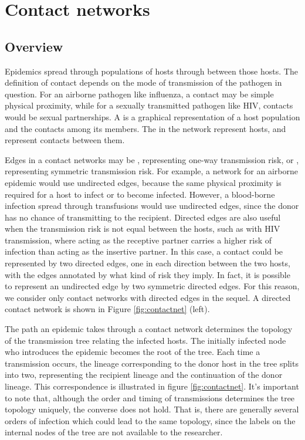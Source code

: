 \section{Contact networks}
\label{subsec:contactnet}

\subsection{Overview}

Epidemics spread through populations of hosts through  between
those hosts. The definition of contact depends on the mode of transmission of
the pathogen in question. For an airborne pathogen like influenza, a contact
may be simple physical proximity, while for a sexually transmitted pathogen
like HIV, contacts would be sexual partnerships. A  is a
graphical representation of a host population and the contacts among its
members. The  in the network represent hosts, and 
represent contacts between them. 

Edges in a contact networks may be , representing one-way
transmission risk, or , representing symmetric transmission
risk. For example, a network for an airborne epidemic would use undirected
edges, because the same physical proximity is required for a host to infect or
to become infected. However, a blood-borne infection spread through
transfusions would use undirected edges, since the donor has no chance of
transmitting to the recipient. Directed edges are also useful when the
transmission risk is not equal between the hosts, such as with HIV
transmission, where acting as the receptive partner carries a higher risk of
infection than acting as the insertive partner. In this case, a contact could
be represented by two directed edges, one in each direction between the two
hosts, with the edges annotated by what kind of risk they imply. In fact, it is
possible to represent an undirected edge by two symmetric directed edges. For
this reason, we consider only contact networks with directed edges in the
sequel. A directed contact network is shown in Figure \ref{fig:contactnet}
(left).

The path an epidemic takes through a contact network determines the topology of
the transmission tree relating the infected hosts. The initially infected node
who introduces the epidemic becomes the root of the tree. Each time a
transmission occurs, the lineage corresponding to the donor host in the tree
splits into two, representing the recipient lineage and the continuation of the
donor lineage. This correspondence is illustrated in figure
\ref{fig:contactnet}. It's important to note that, although the order and
timing of transmissions determines the tree topology uniquely, the converse
does not hold. That is, there are generally several orders of infection which
could lead to the same topology, since the labels on the internal nodes of the
tree are not available to the researcher.

